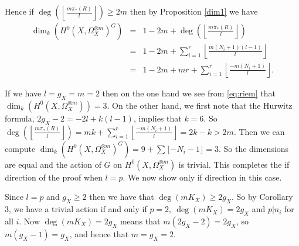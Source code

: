 \documentclass[a4paper,10pt]{article}
\title{}
\author{}
\begin{document}
\maketitle

\begin{abstract}

\end{abstract}

Hence if $\deg\left(\left\lfloor{\frac{m\pi_*(R)}{l}}\right\rfloor \right)\geq 2m$ then by Proposition \ref{dim1} we have
      \begin{eqnarray*}	
	\dim_k(H^0(X,\Omega_X^{\otimes m})^G) & = & 1-2m+\deg\left(\left\lfloor {\frac{m\pi_*(R)}{l}}\right\rfloor \right) \\
	&= & 1-2m+\sum_{i=1}^r \left\lfloor {\frac{m(N_i+1)(l-1)}{l}}\right\rfloor \\
	&= & 1-2m+mr+\sum_{i=1}^r\left\lfloor {\frac{-m(N_i+1)}{l}} \right\rfloor. 
      \end{eqnarray*}
	
    If we have $l=g_X=m=2$ then on the one hand we see from \eqref{eq:riem} that $\dim_k(H^0(X,\Omega_X^{\otimes m}))=3$. 
    On the other hand, we first note that the Hurwitz formula, $2g_X-2=-2l+k(l-1)$, implies that $k=6$. 
    So $\deg\left(\left\lfloor {\frac{m\pi_*(R)}{l}}\right\rfloor \right)=mk+\sum_{i=1}^r\left\lfloor {\frac{-m(N_i+1)}{l}}\right\rfloor =2k-k>2m$. 
    Then we can compute $\dim_k(H^0(X,\Omega_X^{\otimes m})^G)=9+\sum\lfloor-N_i-1\rfloor=3$. 
    So the dimensions are equal and the action of $G$ on $H^0(X,\Omega_X^{\otimes m})$ is trivial. 
    This completes the if direction of the proof when $l=p$.
    We now show only if direction in this case.
    
    Since $l=p$ and $g_X\geq 2$ then we have that $\deg(mK_X)\geq 2g_X$. 
    So by Corollary 3, we have a trivial action if and only if $p=2,\ \deg(mK_X)=2g_X$ and $p|n_i$ for all $i$. 
    Now $\deg(mK_X)=2g_X$ means that $m(2g_X-2)=2g_X$, so $m(g_X-1)=g_X$, and hence that $m=g_X=2$. 
\end{document}
